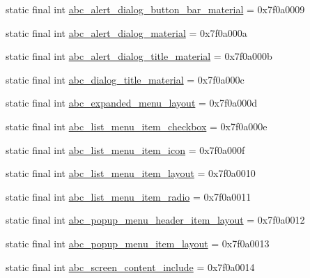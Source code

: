 \begin{DoxyCompactItemize}
\item 
static final int \mbox{\hyperlink{classandroid_1_1support_1_1design_1_1R_1_1layout_a236c5dbe0e7c111d43f617e27569965d}{abc\+\_\+alert\+\_\+dialog\+\_\+button\+\_\+bar\+\_\+material}} = 0x7f0a0009
\item 
static final int \mbox{\hyperlink{classandroid_1_1support_1_1design_1_1R_1_1layout_ae345cc83bdcd7ddfdbf543e4483b9515}{abc\+\_\+alert\+\_\+dialog\+\_\+material}} = 0x7f0a000a
\item 
static final int \mbox{\hyperlink{classandroid_1_1support_1_1design_1_1R_1_1layout_a9d032e94c381c333b51249cb57fa18d3}{abc\+\_\+alert\+\_\+dialog\+\_\+title\+\_\+material}} = 0x7f0a000b
\item 
static final int \mbox{\hyperlink{classandroid_1_1support_1_1design_1_1R_1_1layout_ab98202b6d43ce7854889d44c825908af}{abc\+\_\+dialog\+\_\+title\+\_\+material}} = 0x7f0a000c
\item 
static final int \mbox{\hyperlink{classandroid_1_1support_1_1design_1_1R_1_1layout_a8dd1e24e585a6ed15385c5fa7a9a543b}{abc\+\_\+expanded\+\_\+menu\+\_\+layout}} = 0x7f0a000d
\item 
static final int \mbox{\hyperlink{classandroid_1_1support_1_1design_1_1R_1_1layout_a2c90f63e9a8c8b2e68269eae863ae97d}{abc\+\_\+list\+\_\+menu\+\_\+item\+\_\+checkbox}} = 0x7f0a000e
\item 
static final int \mbox{\hyperlink{classandroid_1_1support_1_1design_1_1R_1_1layout_aaa44eb526bc60350d6aaf3be20618c64}{abc\+\_\+list\+\_\+menu\+\_\+item\+\_\+icon}} = 0x7f0a000f
\item 
static final int \mbox{\hyperlink{classandroid_1_1support_1_1design_1_1R_1_1layout_a7558278a1602fc132cb8a9c6017b5a09}{abc\+\_\+list\+\_\+menu\+\_\+item\+\_\+layout}} = 0x7f0a0010
\item 
static final int \mbox{\hyperlink{classandroid_1_1support_1_1design_1_1R_1_1layout_abeaea14dea4b8b1164cc05e47ab8dde2}{abc\+\_\+list\+\_\+menu\+\_\+item\+\_\+radio}} = 0x7f0a0011
\item 
static final int \mbox{\hyperlink{classandroid_1_1support_1_1design_1_1R_1_1layout_a159a8f906f55f633afac9ad37ffc86c8}{abc\+\_\+popup\+\_\+menu\+\_\+header\+\_\+item\+\_\+layout}} = 0x7f0a0012
\item 
static final int \mbox{\hyperlink{classandroid_1_1support_1_1design_1_1R_1_1layout_a96f5a59e279f130e091777270663f7a3}{abc\+\_\+popup\+\_\+menu\+\_\+item\+\_\+layout}} = 0x7f0a0013
\item 
static final int \mbox{\hyperlink{classandroid_1_1support_1_1design_1_1R_1_1layout_ac1ea0700228284eac706a3d1369d7fab}{abc\+\_\+screen\+\_\+content\+\_\+include}} = 0x7f0a0014

\end{DoxyCompactItemize}
